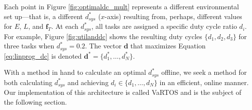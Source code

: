Each point in Figure \ref{fig:optimaldc_mult} represents a different environmental set up---that is, a different $d_{sys}^*$ ($x$-axis) resulting from, perhaps, different values for $E$, $L$, and $\pmb{f}_T$. At each $d_{sys}^*$, all tasks are assigned a specific duty cycle ratio $d_i$.  For example, Figure \ref{fig:utilanddc} shows the resulting duty cycles $\{d_1, d_2, d_3\}$ for three tasks when $d_{sys}^* = 0.2$.  The vector $\pmb{d}$ that maximizes Equation \ref{eq:linprog_dc} is denoted $\pmb{d}^* = \{d_1^*,\ldots,d_N^*\}$. 

With a method in hand to calculate an optimal $d_{sys}^*$ offline, we seek a method for both calculating $d_{sys}^*$ and achieving $d_i \in \{d_1,\ldots,d_N\}$ in an efficient, online manner.  Our implementation of this architecture is called VaRTOS and is the subject of the following section. 



